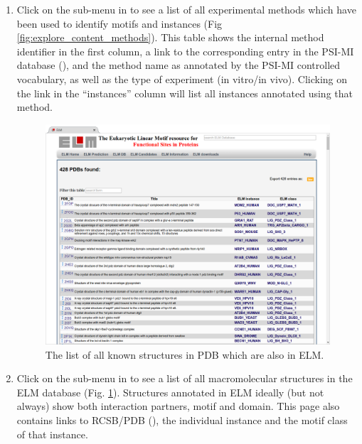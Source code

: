 \begin{enumerate}
\item Click on the sub-menu  in  to see a
	list of all experimental methods which have been used to identify
	motifs and instances
	(Fig \ref{fig:explore_content_methods}).
	This table shows the internal method
	identifier in the first column, a link to the corresponding entry in
	the PSI-MI database (\cite{17925023}), and the method name as annotated
	by the PSI-MI controlled vocabulary, as well as the type of experiment
	(in vitro/in vivo). Clicking on the link in the ``instances'' column
	will list all instances annotated using that method.  


\begin{figure}[h!]
	\centering
	\includegraphics[width=\textwidth]{Figures/explore_content/pdbs.png} 
	\caption{
	The list of all known structures in PDB which are also in ELM.
	}
	\label{fig:explore_content_pdbs}
\end{figure}

\item Click on the sub-menu  in  to
	see a list of all macromolecular structures in the ELM database
	(Fig. \ref{fig:explore_content_pdbs}).
	Structures annotated in ELM ideally (but not always) show
	both interaction partners, motif and domain. This page also contains
	links to RCSB/PDB (\cite{12037327}), the individual instance and the motif
	class of that instance.


\end{enumerate}
